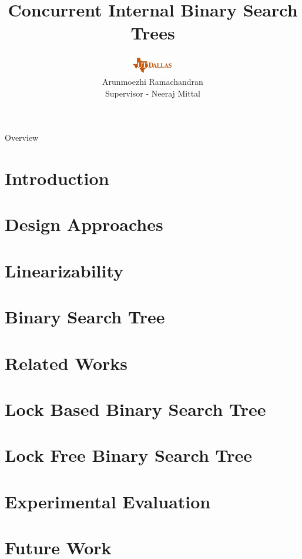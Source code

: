 \documentclass{beamer}
\title{Concurrent Internal Binary Search Trees}
\author[Arun]{\includegraphics[height=0.8cm]{figures/utd_logo.jpg}\\
Arunmoezhi Ramachandran \\
Supervisor - Neeraj Mittal\\
}
\institute[UTDallas]{The University of Texas at Dallas}
\date{}
\begin{document}
\begin{frame}
	\titlepage
\end{frame}

		
\begin{frame}{Overview}
	\tableofcontents
\end{frame}

\section{Introduction}


\section{Design Approaches}


\section{Linearizability}


\section{Binary Search Tree}


\section{Related Works}


\section{Lock Based Binary Search Tree}


\section{Lock Free Binary Search Tree}


\section{Experimental Evaluation}


\section{Future Work}

\end{document}
